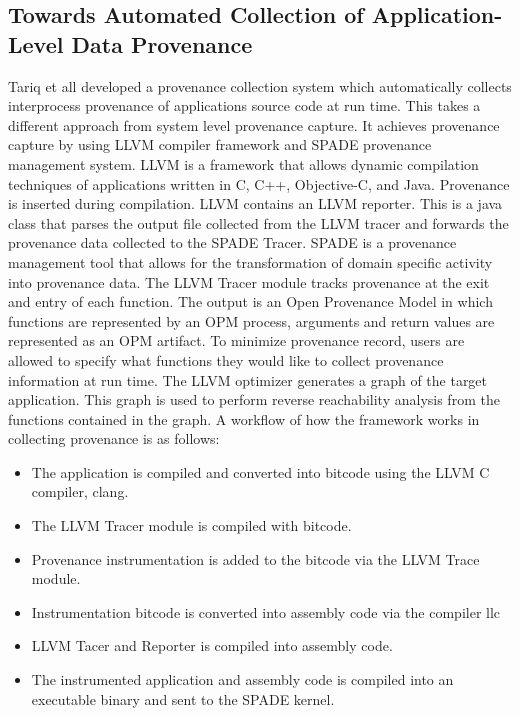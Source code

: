 \subsection{Towards Automated Collection of Application-Level Data Provenance}
Tariq et \cite{tariq_towards_2012} all developed a provenance collection system which automatically collects interprocess provenance of applications source code at run time. This takes a different approach from system level provenance capture. It achieves provenance capture by using LLVM compiler framework and SPADE provenance management system. LLVM is a framework that allows dynamic compilation techniques of applications written in C, C++, Objective-C, and Java. Provenance is inserted during compilation. LLVM contains an LLVM reporter. This is a java class that parses the output file collected from the LLVM tracer and forwards the provenance data collected to the SPADE Tracer. SPADE is a provenance management tool that allows for the transformation of domain specific activity into provenance data. The LLVM Tracer module tracks provenance at the exit and entry of each function. The output is an Open Provenance Model in which functions are represented by an OPM process, arguments and return values are represented as an OPM artifact. To minimize provenance record, users are allowed to specify what functions they would like to collect provenance information at run time. The LLVM optimizer generates a graph of the target application. This graph is used to perform reverse reachability analysis  from the functions contained in the graph. A workflow of how the framework works in collecting provenance is as follows:

\begin{itemize}
\item The application is compiled and converted into bitcode using the LLVM C compiler, clang.

\item The LLVM Tracer module is compiled with bitcode.

\item Provenance instrumentation is added to the bitcode via the LLVM Trace module.

\item Instrumentation bitcode is converted into assembly code via the compiler llc

\item LLVM Tacer and Reporter is compiled into assembly code.

\item  The instrumented application and assembly code is compiled into an executable binary and sent to the SPADE kernel.
\end{itemize}

